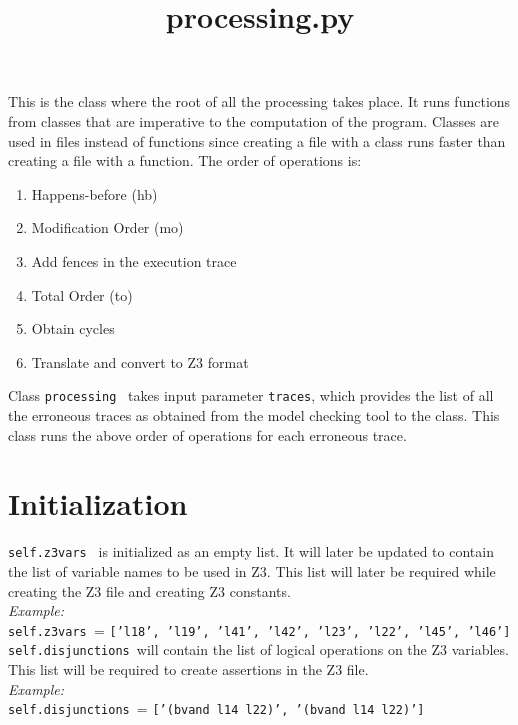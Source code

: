 \documentclass{article}
\date{}
\newcommand{\var}[1]{\color{OliveGreen} \texttt{#1}\color{black}}
\newcommand{\varinfo}[1]{\scriptsize \texttt{#1} \normalsize}
\newcommand{\class}[1]{\color{DarkOrchid}\texttt{#1}\color{black}}
\begin{document}
\title{processing.py}
\maketitle

\par
This is the class where the root of all the processing takes place. It runs functions from classes that are imperative to the computation of the program. Classes are used in files instead of functions since creating a file with a class runs faster than creating a file with a function. The order of operations is:
\begin{enumerate}
    \item Happens-before (hb)
    \item Modification Order (mo)
    \item Add fences in the execution trace
    \item Total Order (to)
    \item Obtain cycles
    \item Translate and convert to Z3 format
\end{enumerate}
Class \class{processing } takes input parameter \var{traces}, which provides the list of all the erroneous traces as obtained from the model checking tool to the class. This class runs the above order of operations for each erroneous trace.

\section{Initialization}
\par
\var{self.z3vars } is initialized as an empty list. It will later be updated to contain the list of variable names to be used in Z3. This list will later be required while creating the Z3 file and creating Z3 constants.\\
\textit{Example:}\\
\var{self.z3vars }= \varinfo{['l18', 'l19', 'l41', 'l42', 'l23', 'l22', 'l45', 'l46']}\\

\var{self.disjunctions }will contain the list of logical operations on the Z3 variables. This list will be required to create assertions in the Z3 file.\\
\textit{Example:}\\
\var{self.disjunctions }= \varinfo{['(bvand l14 l22)', '(bvand l14 l22)']}\\
\end{document}
